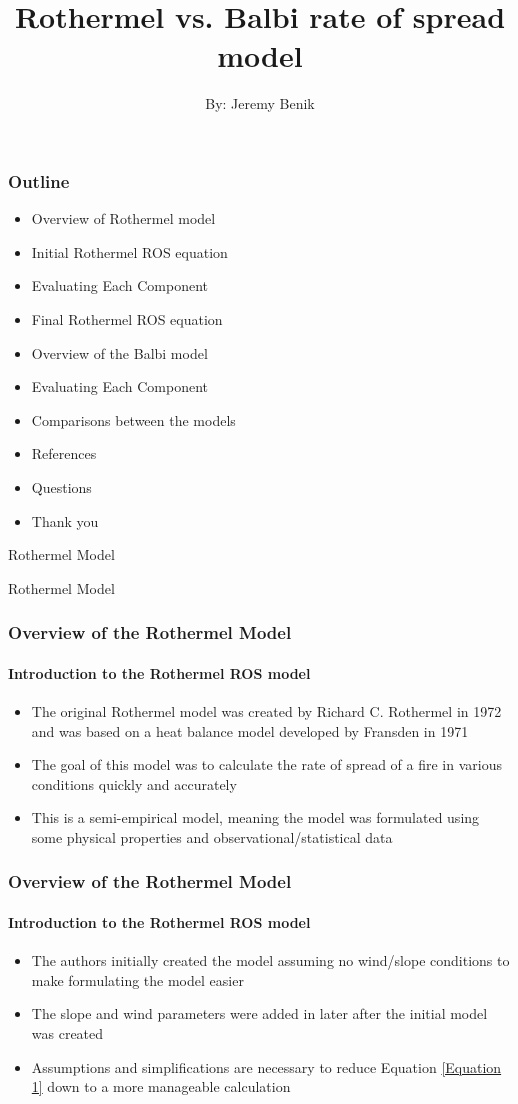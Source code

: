 \documentclass{beamer}
\title{Rothermel vs. Balbi rate of spread model}
\subtitle{By: Jeremy Benik}
\begin{document}
\pagecolor{yellow!30!orange}
	\begin{frame}
		\titlepage
	\end{frame}
	\begin{frame}
		\frametitle{Outline}
		\begin{itemize}
		\setlength{\itemsep}{3mm}
			\item Overview of Rothermel model
			\item Initial Rothermel ROS equation
			\item Evaluating Each Component
			\item Final Rothermel ROS equation
			\item Overview of the Balbi model
			\item Evaluating Each Component
			\item Comparisons between the models
			\item References
			\item Questions
			\item Thank you
		\end{itemize}
	\end{frame}
	
		\begin{frame} {Rothermel Model}
\begin{center}
{\fontsize{40}{50}\selectfont Rothermel Model}
\end{center}
\end{frame}

	\begin{frame}
		\frametitle{Overview of the Rothermel Model}
		\framesubtitle{Introduction to the Rothermel ROS model}
		\begin{itemize}
		\setlength{\itemsep}{10mm}
			\item The original Rothermel model was created by Richard C. Rothermel in 1972 and was based on a heat balance model developed by Fransden in 1971
			\item The goal of this model was to calculate the rate of spread of a fire in various conditions quickly and accurately
			\item This is a semi-empirical model, meaning the model was formulated using some physical properties and observational/statistical data
		\end{itemize}
	\end{frame}

	\begin{frame}
			\frametitle{Overview of the Rothermel Model}
		\framesubtitle{Introduction to the Rothermel ROS model}
		\begin{itemize} 
		\setlength{\itemsep}{10mm}
			\item The authors initially created the model assuming no wind/slope conditions to make formulating the model easier
			\item The slope and wind parameters were added in later after the initial model was created
			\item Assumptions and simplifications are necessary to reduce Equation \ref{Equation 1} down to a more manageable calculation
		\end{itemize}
	\end{frame}
	
\end{document}
